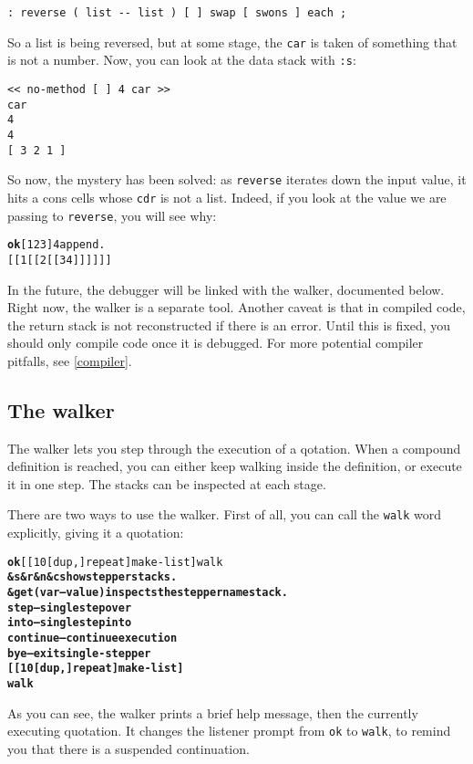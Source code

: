 \documentclass{report}
\begin{document}
\begin{verbatim}
: reverse ( list -- list ) [ ] swap [ swons ] each ;
\end{verbatim}

So a list is being reversed, but at some stage, the \texttt{car} is taken of something that is not a number. Now, you can look at the data stack with \texttt{:s}:

\begin{verbatim}
<< no-method [ ] 4 car >>
car
4
4
[ 3 2 1 ]
\end{verbatim}

So now, the mystery has been solved: as \texttt{reverse} iterates down the input value, it hits a cons cells whose \texttt{cdr} is not a list. Indeed, if you look at the value we are passing to \texttt{reverse}, you will see why:

\begin{alltt}
\textbf{ok} [ 1 2 3 ] 4 append .
[[ 1 [[ 2 [[ 3 4 ]] ]] ]]
\end{alltt}

In the future, the debugger will be linked with the walker, documented below. Right now, the walker is a separate tool. Another caveat is that in compiled code, the return stack is not reconstructed if there is an error. Until this is fixed, you should only compile code once it is debugged. For more potential compiler pitfalls, see \ref{compiler}.

\subsection{The walker}

The walker lets you step through the execution of a qotation. When a compound definition is reached, you can either keep walking inside the definition, or execute it in one step. The stacks can be inspected at each stage.

There are two ways to use the walker. First of all, you can call the \texttt{walk} word explicitly, giving it a quotation:

\begin{alltt}
\textbf{ok} [ [ 10 [ dup , ] repeat ] make-list ] walk
\textbf{\&s \&r \&n \&c show stepper stacks.
\&get ( var -- value ) inspects the stepper namestack.
step -- single step over
into -- single step into
continue -- continue execution
bye -- exit single-stepper
[ [ 10 [ dup , ] repeat ] make-list ]
walk}
\end{alltt}

As you can see, the walker prints a brief help message, then the currently executing quotation. It changes the listener prompt from \texttt{ok} to \texttt{walk}, to remind you that there is a suspended continuation.
\end{document}
